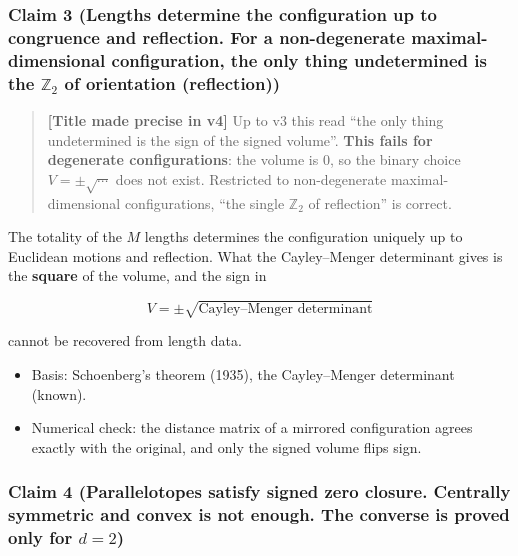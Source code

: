 \documentclass[
  10pt,
]{article}
\providecommand{\tightlist}{%
  \setlength{\itemsep}{0pt}\setlength{\parskip}{0pt}}
\begin{document}
\subsubsection{\texorpdfstring{Claim 3 (Lengths determine the
configuration up to congruence and reflection. For a non-degenerate
maximal-dimensional configuration, the only thing undetermined is the
\(\mathbb{Z}_2\) of orientation
(reflection))}{Claim 3 (Lengths determine the configuration up to congruence and reflection. For a non-degenerate maximal-dimensional configuration, the only thing undetermined is the \textbackslash mathbb\{Z\}\_2 of orientation (reflection))}}\label{claim-3-lengths-determine-the-configuration-up-to-congruence-and-reflection.-for-a-non-degenerate-maximal-dimensional-configuration-the-only-thing-undetermined-is-the-mathbbz_2-of-orientation-reflection}

\begin{quote}
\textbf{{[}Title made precise in v4{]}} Up to v3 this read ``the only
thing undetermined is the sign of the signed volume''. \textbf{This
fails for degenerate configurations}: the volume is \(0\), so the binary
choice \(V = \pm\sqrt{\cdots}\) does not exist. Restricted to
non-degenerate maximal-dimensional configurations, ``the single
\(\mathbb{Z}_2\) of reflection'' is correct.
\end{quote}

The totality of the \(M\) lengths determines the configuration uniquely
up to Euclidean motions and reflection. What the Cayley--Menger
determinant gives is the \textbf{square} of the volume, and the sign in

\[V = \pm\sqrt{\text{Cayley–Menger determinant}}\]

cannot be recovered from length data.

\begin{itemize}
\tightlist
\item
  Basis: Schoenberg's theorem (1935), the Cayley--Menger determinant
  (known).
\item
  Numerical check: the distance matrix of a mirrored configuration
  agrees exactly with the original, and only the signed volume flips
  sign.
\end{itemize}

\subsubsection{\texorpdfstring{Claim 4 (Parallelotopes satisfy signed
zero closure. Centrally symmetric and convex is not enough. The converse
is proved only for
\(d=2\))}{Claim 4 (Parallelotopes satisfy signed zero closure. Centrally symmetric and convex is not enough. The converse is proved only for d=2)}}\label{claim-4-parallelotopes-satisfy-signed-zero-closure.-centrally-symmetric-and-convex-is-not-enough.-the-converse-is-proved-only-for-d2}
\end{document}
